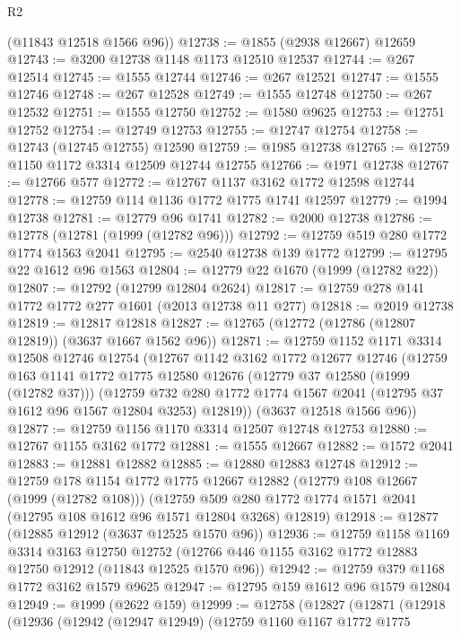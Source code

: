 \begin{lexlean}{R2}
\begin{coremodule}
      (@11843 @12518 @1566 @96))
@12738 := @1855 (@2938 @12667) @12659
@12743 := @3200 @12738 @1148 @1173 @12510 @12537
@12744 := @267 @12514
@12745 := @1555 @12744
@12746 := @267 @12521
@12747 := @1555 @12746
@12748 := @267 @12528
@12749 := @1555 @12748
@12750 := @267 @12532
@12751 := @1555 @12750
@12752 := @1580 @9625
@12753 := @12751 @12752
@12754 := @12749 @12753
@12755 := @12747 @12754
@12758 := @12743 (@12745 @12755) @12590
@12759 := @1985 @12738
@12765 := @12759 @1150 @1172 @3314 @12509 @12744 @12755
@12766 := @1971 @12738
@12767 := @12766 @577
@12772 := @12767 @1137 @3162 @1772 @12598 @12744
@12778 := @12759 @114 @1136 @1772 @1775 @1741 @12597
@12779 := @1994 @12738
@12781 := @12779 @96 @1741
@12782 := @2000 @12738
@12786 := @12778 (@12781 (@1999 (@12782 @96)))
@12792 := @12759 @519 @280 @1772 @1774 @1563 @2041
@12795 := @2540 @12738 @139 @1772
@12799 := @12795 @22 @1612 @96 @1563
@12804 := @12779 @22 @1670 (@1999 (@12782 @22))
@12807 := @12792 (@12799 @12804 @2624)
@12817 := @12759 @278 @141 @1772 @1772 @277 @1601 (@2013 @12738 @11 @277)
@12818 := @2019 @12738
@12819 := @12817 @12818
@12827 := @12765 (@12772 (@12786 (@12807 @12819)) (@3637 @1667 @1562 @96))
@12871 := @12759
    @1152
    @1171
    @3314
    @12508
    @12746
    @12754
    (@12767
      @1142
      @3162
      @1772
      @12677
      @12746
      (@12759
        @163
        @1141
        @1772
        @1775
        @12580
        @12676
        (@12779 @37 @12580 (@1999 (@12782 @37)))
        (@12759 @732 @280 @1772 @1774 @1567 @2041 (@12795 @37 @1612 @96 @1567 @12804 @3253) @12819))
      (@3637 @12518 @1566 @96))
@12877 := @12759 @1156 @1170 @3314 @12507 @12748 @12753
@12880 := @12767 @1155 @3162 @1772
@12881 := @1555 @12667
@12882 := @1572 @2041
@12883 := @12881 @12882
@12885 := @12880 @12883 @12748
@12912 := @12759
    @178
    @1154
    @1772
    @1775
    @12667
    @12882
    (@12779 @108 @12667 (@1999 (@12782 @108)))
    (@12759 @509 @280 @1772 @1774 @1571 @2041 (@12795 @108 @1612 @96 @1571 @12804 @3268) @12819)
@12918 := @12877 (@12885 @12912 (@3637 @12525 @1570 @96))
@12936 := @12759
    @1158
    @1169
    @3314
    @3163
    @12750
    @12752
    (@12766 @446 @1155 @3162 @1772 @12883 @12750 @12912 (@11843 @12525 @1570 @96))
@12942 := @12759 @379 @1168 @1772 @3162 @1579 @9625
@12947 := @12795 @159 @1612 @96 @1579 @12804
@12949 := @1999 (@2622 @159)
@12999 := @12758
    (@12827
      (@12871
        (@12918
          (@12936
            (@12942
              (@12947 @12949)
              (@12759
                @1160
                @1167
                @1772
                @1775

\end{coremodule}
\end{lexlean}
